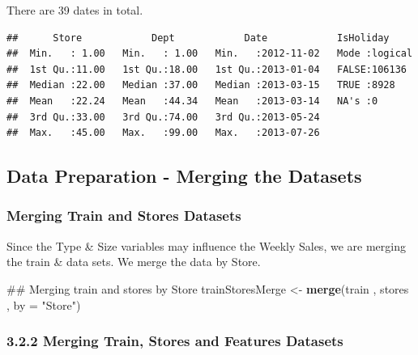 \documentclass[]{article}
\newenvironment{Shaded}{\begin{snugshade}}{\end{snugshade}}
\newcommand{\KeywordTok}[1]{\textcolor[rgb]{0.13,0.29,0.53}{\textbf{{#1}}}}
\newcommand{\DataTypeTok}[1]{\textcolor[rgb]{0.13,0.29,0.53}{{#1}}}
\newcommand{\StringTok}[1]{\textcolor[rgb]{0.31,0.60,0.02}{{#1}}}
\newcommand{\NormalTok}[1]{{#1}}
\begin{document}
There are 39 dates in total.

\begin{Shaded}
\end{Shaded}

\begin{verbatim}
##      Store            Dept            Date            IsHoliday      
##  Min.   : 1.00   Min.   : 1.00   Min.   :2012-11-02   Mode :logical  
##  1st Qu.:11.00   1st Qu.:18.00   1st Qu.:2013-01-04   FALSE:106136   
##  Median :22.00   Median :37.00   Median :2013-03-15   TRUE :8928     
##  Mean   :22.24   Mean   :44.34   Mean   :2013-03-14   NA's :0        
##  3rd Qu.:33.00   3rd Qu.:74.00   3rd Qu.:2013-05-24                  
##  Max.   :45.00   Max.   :99.00   Max.   :2013-07-26
\end{verbatim}

\pagebreak

\subsection{Data Preparation - Merging the
Datasets}\label{data-preparation---merging-the-datasets}

\subsubsection{Merging Train and Stores
Datasets}\label{merging-train-and-stores-datasets}

Since the Type \& Size variables may influence the Weekly Sales, we are
merging the train \& data sets. We merge the data by Store.

\begin{Shaded}
\begin{Highlighting}[]
\NormalTok{## Merging train and stores by Store}
\NormalTok{trainStoresMerge <-}\StringTok{ }\KeywordTok{merge}\NormalTok{(train , stores , }\DataTypeTok{by =} \StringTok{"Store"}\NormalTok{)}
\end{Highlighting}
\end{Shaded}

\subsubsection{3.2.2 Merging Train, Stores and Features
Datasets}\label{merging-train-stores-and-features-datasets}
\end{document}
